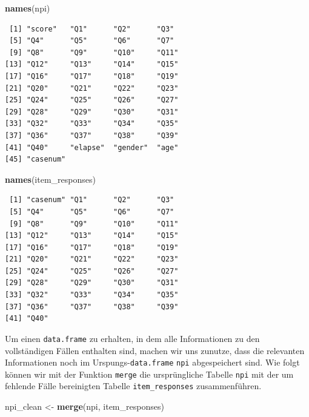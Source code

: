 \documentclass[12pt,]{tufte-book}
\newenvironment{Shaded}{\begin{snugshade}}{\end{snugshade}}
\newcommand{\KeywordTok}[1]{\textcolor[rgb]{0.13,0.29,0.53}{\textbf{#1}}}
\newcommand{\StringTok}[1]{\textcolor[rgb]{0.31,0.60,0.02}{#1}}
\newcommand{\NormalTok}[1]{#1}
\theoremstyle{definition}
\theoremstyle{definition}
\theoremstyle{definition}
\theoremstyle{remark}
\begin{document}
\begin{Shaded}
\begin{Highlighting}[]
\KeywordTok{names}\NormalTok{(npi)}
\end{Highlighting}
\end{Shaded}

\begin{verbatim}
 [1] "score"   "Q1"      "Q2"      "Q3"     
 [5] "Q4"      "Q5"      "Q6"      "Q7"     
 [9] "Q8"      "Q9"      "Q10"     "Q11"    
[13] "Q12"     "Q13"     "Q14"     "Q15"    
[17] "Q16"     "Q17"     "Q18"     "Q19"    
[21] "Q20"     "Q21"     "Q22"     "Q23"    
[25] "Q24"     "Q25"     "Q26"     "Q27"    
[29] "Q28"     "Q29"     "Q30"     "Q31"    
[33] "Q32"     "Q33"     "Q34"     "Q35"    
[37] "Q36"     "Q37"     "Q38"     "Q39"    
[41] "Q40"     "elapse"  "gender"  "age"    
[45] "casenum"
\end{verbatim}

\begin{Shaded}
\begin{Highlighting}[]
\KeywordTok{names}\NormalTok{(item_responses)}
\end{Highlighting}
\end{Shaded}

\begin{verbatim}
 [1] "casenum" "Q1"      "Q2"      "Q3"     
 [5] "Q4"      "Q5"      "Q6"      "Q7"     
 [9] "Q8"      "Q9"      "Q10"     "Q11"    
[13] "Q12"     "Q13"     "Q14"     "Q15"    
[17] "Q16"     "Q17"     "Q18"     "Q19"    
[21] "Q20"     "Q21"     "Q22"     "Q23"    
[25] "Q24"     "Q25"     "Q26"     "Q27"    
[29] "Q28"     "Q29"     "Q30"     "Q31"    
[33] "Q32"     "Q33"     "Q34"     "Q35"    
[37] "Q36"     "Q37"     "Q38"     "Q39"    
[41] "Q40"    
\end{verbatim}

Um einen \texttt{data.frame} zu erhalten, in dem alle Informationen zu
den vollständigen Fällen enthalten sind, machen wir uns zunutze, dass
die relevanten Informationen noch im Urspungs-\texttt{data.frame}
\texttt{npi} abgespeichert sind. Wie folgt können wir mit der Funktion
\texttt{merge} die ursprüngliche Tabelle \texttt{npi} mit der um
fehlende Fälle bereinigten Tabelle \texttt{item\_responses}
zusammenführen.

\begin{Shaded}
\begin{Highlighting}[]
\NormalTok{npi_clean <-}\StringTok{ }\KeywordTok{merge}\NormalTok{(npi, item_responses)}
\end{Highlighting}
\end{Shaded}
\end{document}
